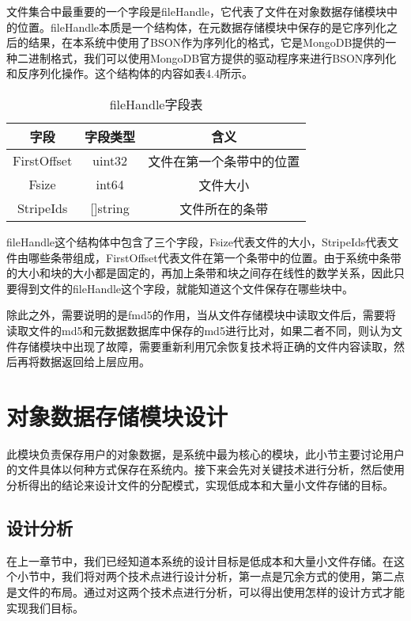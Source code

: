 文件集合中最重要的一个字段是fileHandle，它代表了文件在对象数据存储模块中的位置。fileHandle本质是一个结构体，在元数据存储模块中保存的是它序列化之后的结果，在本系统中使用了BSON作为序列化的格式，它是MongoDB提供的一种二进制格式，我们可以使用MongoDB官方提供的驱动程序来进行BSON序列化和反序列化操作。这个结构体的内容如表4.4所示。

\begin{table}[h]
  \centering
  \caption{fileHandle字段表}
  \begin{tabular}{ccc}
    \toprule
    字段   & 字段类型   & 含义                          \\
    \midrule
    FirstOffset & uint32     & 文件在第一个条带中的位置                 \\
    Fsize       & int64      & 文件大小                \\
    StripeIds   & []string   & 文件所在的条带         \\
    \bottomrule
  \end{tabular}
\end{table}

fileHandle这个结构体中包含了三个字段，Fsize代表文件的大小，StripeIds代表文件由哪些条带组成，FirstOffset代表文件在第一个条带中的位置。由于系统中条带的大小和块的大小都是固定的，再加上条带和块之间存在线性的数学关系，因此只要得到文件的fileHandle这个字段，就能知道这个文件保存在哪些块中。

除此之外，需要说明的是fmd5的作用，当从文件存储模块中读取文件后，需要将读取文件的md5和元数据数据库中保存的md5进行比对，如果二者不同，则认为文件存储模块中出现了故障，需要重新利用冗余恢复技术将正确的文件内容读取，然后再将数据返回给上层应用。

\section{对象数据存储模块设计}
此模块负责保存用户的对象数据，是系统中最为核心的模块，此小节主要讨论用户的文件具体以何种方式保存在系统内。接下来会先对关键技术进行分析，然后使用分析得出的结论来设计文件的分配模式，实现低成本和大量小文件存储的目标。

\subsection{设计分析}
在上一章节中，我们已经知道本系统的设计目标是低成本和大量小文件存储。在这个小节中，我们将对两个技术点进行设计分析，第一点是冗余方式的使用，第二点是文件的布局。通过对这两个技术点进行分析，可以得出使用怎样的设计方式才能实现我们目标。

